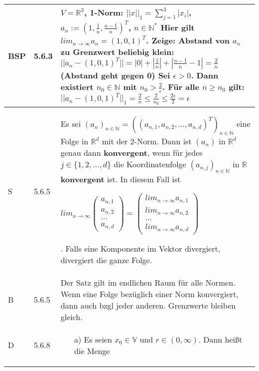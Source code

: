 \begin{longtable}{p{0.75cm} p{1cm} p{16cm}}
        \midrule
        BSP & 5.6.3 &   $V = \mathbb{R}^3$, 1-Norm: $||x||_1 = \sum^3_{j=1} |x_i|$, $a_n := (1, \frac{1}{n}, \frac{n-1}{n})^T$, $n \in \mathbb{N^*}$ \hfill \break
                    Hier gilt $lim_{n \rightarrow \infty} a_n = (1,0,1)^T$. Zeige: Abstand von $a_n$ zu Grenzwert beliebig klein: \hfill \break
                    $||a_n - (1,0,1)^T|| = |0| + |\frac{1}{n}| + |\frac{n-1}{n}-1| = \frac{2}{n}$ (Abstand geht gegen 0) \hfill \break
                    Sei $\epsilon > 0$. Dann existiert $n_0 \in \mathbb{N}$ mit $n_0 > \frac{2}{\epsilon}$. Für alle $n \geq n_0$ gilt: \hfill \break
                    $||a_n - (1,0,1)^T||_1 = \frac{2}{n} \leq \frac{2}{n_0} \leq \frac{2\epsilon}{2} = \epsilon$ \\
        \midrule
        S   & 5.6.5 &   Es sei $(a_n)_{n \in \mathbb{N}} = ((a_{n,1}, a_{n,2}, \dots, a_{n,d})^T)_{n \in \mathbb{N}}$ eine Folge in $\mathbb{R}^d$
                    mit der 2-Norm. Dann ist $(a_n)$ in $\mathbb{R}^d$ genau dann \textbf{konvergent}, wenn für jedes $j \in \{1,2,\dots,d\}$ die
                    Koordinatenfolge $(a_{n,j})_{n \in \mathbb{N}}$ in $\mathbb{R}$ \textbf{konvergent} ist. In diesem Fall ist \hfill \break
                    \centerline{$lim_{n \rightarrow \infty}\begin{pmatrix}a_{n,1}\\a_{n,2}\\\dots \\ a_{n,d}\end{pmatrix} =
                        \begin{pmatrix} lim_{n \rightarrow \infty} a_{n,1} \\ lim_{n \rightarrow \infty} a_{n,2} \\ \dots \\
                        lim_{n \rightarrow \infty} a_{n,d} \end{pmatrix}$}.
                    Falls eine Komponente im Vektor divergiert, divergiert die ganze Folge. \\
        \midrule
        B   & 5.6.5 &   Der Satz gilt im endlichen Raum für alle Normen. \hfill \break
                    Wenn eine Folge bezüglich einer Norm konvergiert, dann auch bzgl jeder anderen. \hfill \break 
                    Grenzwerte bleiben gleich. \\
        \midrule
        D   & 5.6.8 &   \begin{itemize}[topsep=-0.5cm]
                            \item[a)] Es seien $x_0 \in \mathbb{V}$ und $r \in (0, \infty)$. Dann heißt die Menge \hfill \break

\end{itemize}
\end{longtable}
